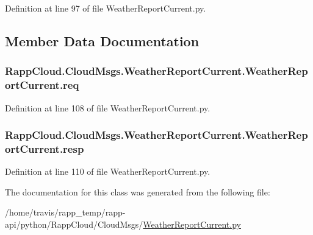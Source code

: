 Definition at line 97 of file Weather\-Report\-Current.\-py.



\subsection{Member Data Documentation}
\hypertarget{classRappCloud_1_1CloudMsgs_1_1WeatherReportCurrent_1_1WeatherReportCurrent_a3fbe00a0725821edd4f8bd6fee657751}{
\subsubsection[{req}]{\setlength{\rightskip}{0pt plus 5cm}Rapp\-Cloud.\-Cloud\-Msgs.\-Weather\-Report\-Current.\-Weather\-Report\-Current.\-req}}\label{classRappCloud_1_1CloudMsgs_1_1WeatherReportCurrent_1_1WeatherReportCurrent_a3fbe00a0725821edd4f8bd6fee657751}


Definition at line 108 of file Weather\-Report\-Current.\-py.

\hypertarget{classRappCloud_1_1CloudMsgs_1_1WeatherReportCurrent_1_1WeatherReportCurrent_a82bdfd470647e7a2af126749ffb372b8}{
\subsubsection[{resp}]{\setlength{\rightskip}{0pt plus 5cm}Rapp\-Cloud.\-Cloud\-Msgs.\-Weather\-Report\-Current.\-Weather\-Report\-Current.\-resp}}\label{classRappCloud_1_1CloudMsgs_1_1WeatherReportCurrent_1_1WeatherReportCurrent_a82bdfd470647e7a2af126749ffb372b8}


Definition at line 110 of file Weather\-Report\-Current.\-py.



The documentation for this class was generated from the following file\-:\begin{DoxyCompactItemize}
\item 
/home/travis/rapp\-\_\-temp/rapp-\/api/python/\-Rapp\-Cloud/\-Cloud\-Msgs/\hyperlink{WeatherReportCurrent_8py}{Weather\-Report\-Current.\-py}\end{DoxyCompactItemize}
